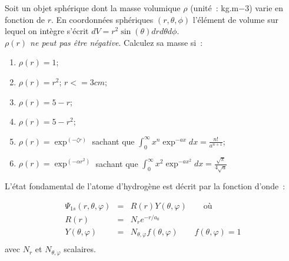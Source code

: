 Soit un objet sph\'erique dont la masse volumique $\rho$ (unit\'e~: kg.m${-3}$) varie en
fonction de $r$.  
En coordonn\'ees sph\'eriques $(r,\theta,\phi)$ 
l'\'el\'ement de volume sur lequel on int\`egre
s'\'ecrit $dV=r^2\sin(\theta)drd\theta d\phi$.\\
\textit{$\rho(r)$ ne peut pas \^etre n\'egative}.
Calculez sa masse si~:

\begin{enumerate}
\item $\rho(r)=1$;
\item $\rho(r)=r^{2}$; $r<=3cm$;
\item $\rho(r)=5-r$;
\item $\rho(r)=5-r^{2}$;
\item $\rho(r)=\exp^{(-\zeta r)}$ sachant que $\int_{0}^{\infty}x^{n}\exp^{-ax}dx=\frac{n!}{a^{n+1}}$;
\item $\rho(r)=\exp^{(-\alpha r^{2})}$ sachant que $\int_{0}^{\infty}x^{2}\exp^{-ax^{2}}dx=\frac{\sqrt{\pi}}{4\sqrt{a}}$
\end{enumerate}



L'\'etat fondamental de l'atome d'hydrog\`ene est d\'ecrit par la fonction d'onde~:

\[
\begin{array}{rcl}
\Psi_{1s}(r,\theta,\varphi) &=& R(r) Y(\theta,\varphi) \qquad \text{o\`u}\\[0.3cm]
R(r)                        &=& N_r e^{-r/a_0}        \\
Y(\theta,\varphi)           &=& N_{\theta,\varphi} f(\theta,\varphi) \qquad f(\theta,\varphi) = 1\\
\end{array}
\]
avec $N_r$ et $N_{\theta,\varphi}$ scalaires.

